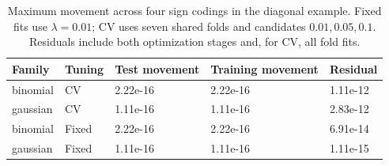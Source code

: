 \begin{table}[ht]
\centering
\small
\caption{Maximum movement across four sign codings in the diagonal
example. Fixed fits use $\lambda=0.01$; CV uses seven shared folds
and candidates $0.01,0.05,0.1$. Residuals include both optimization
stages and, for CV, all fold fits.}
\label{tab:example}

\begin{tabular}{lllll}
\toprule
Family & Tuning & Test movement & Training movement & Residual\\
\midrule
binomial & CV & 2.22e-16 & 2.22e-16 & 1.11e-12\\
gaussian & CV & 1.11e-16 & 1.11e-16 & 2.83e-12\\
binomial & Fixed & 2.22e-16 & 2.22e-16 & 6.91e-14\\
gaussian & Fixed & 1.11e-16 & 1.11e-16 & 1.11e-15\\
\bottomrule
\end{tabular}
\end{table}
